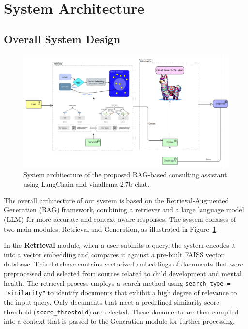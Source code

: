\documentclass[conference]{IEEEtran}
\begin{document}
\section{System Architecture}
\label{sec:System Architecture}
\subsection{Overall System Design}
\label{sec:Overall System Design}
    \begin{figure}[ht]
    \centering
    \includegraphics[width=0.95\linewidth]{bibliography/Figure/system-architech.png}
    \caption{System architecture of the proposed RAG-based consulting assistant using LangChain and vinallama-2.7b-chat.}
    \label{fig:architecture}
    \end{figure}
The overall architecture of our system is based on the Retrieval-Augmented Generation (RAG) framework, combining a retriever and a large language model (LLM) for more accurate and context-aware responses. The system consists of two main modules: Retrieval and Generation, as illustrated in Figure~\ref{fig:architecture}.

In the \textbf{Retrieval} module, when a user submits a query, the system encodes it into a vector embedding and compares it against a pre-built FAISS vector database. This database contains vectorized embeddings of documents that were preprocessed and selected from sources related to child development and mental health. The retrieval process employs a search method using \texttt{search\_type = "similarity"} to identify documents that exhibit a high degree of relevance to the input query. Only documents that meet a predefined similarity score threshold (\texttt{score\_threshold}) are selected. These documents are then compiled into a context that is passed to the Generation module for further processing.
\end{document}
